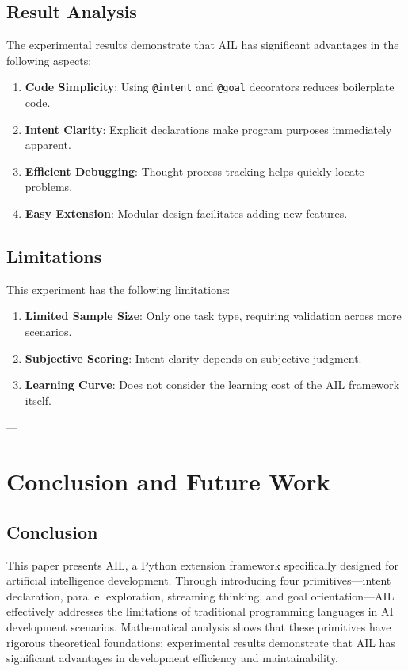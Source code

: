 \documentclass[12pt,a4paper]{article}
\begin{document}
\subsection{Result Analysis}

The experimental results demonstrate that AIL has significant advantages in the following aspects:

\begin{enumerate}
\item \textbf{Code Simplicity}: Using \texttt{@intent} and \texttt{@goal} decorators reduces boilerplate code.
\item \textbf{Intent Clarity}: Explicit declarations make program purposes immediately apparent.
\item \textbf{Efficient Debugging}: Thought process tracking helps quickly locate problems.
\item \textbf{Easy Extension}: Modular design facilitates adding new features.
\end{enumerate}

\subsection{Limitations}

This experiment has the following limitations:

\begin{enumerate}
\item \textbf{Limited Sample Size}: Only one task type, requiring validation across more scenarios.
\item \textbf{Subjective Scoring}: Intent clarity depends on subjective judgment.
\item \textbf{Learning Curve}: Does not consider the learning cost of the AIL framework itself.
\end{enumerate}

---

\section{Conclusion and Future Work}

\subsection{Conclusion}

This paper presents AIL, a Python extension framework specifically designed for artificial intelligence development. Through introducing four primitives—intent declaration, parallel exploration, streaming thinking, and goal orientation—AIL effectively addresses the limitations of traditional programming languages in AI development scenarios. Mathematical analysis shows that these primitives have rigorous theoretical foundations; experimental results demonstrate that AIL has significant advantages in development efficiency and maintainability.
\end{document}
